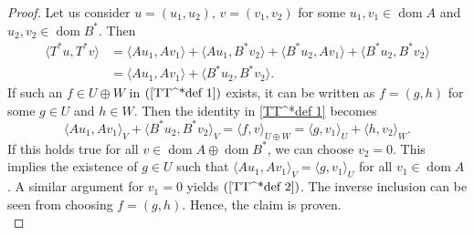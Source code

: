 \documentclass[11pt]{article}
\theoremstyle{definition}
\theoremstyle{remark}
\DeclareMathOperator\dom{dom}
\begin{document}
\begin{proof}
Let us consider $u=(u_1,u_2),\, v=(v_1,v_2)$ for some $u_1,v_1\in \dom A$ and $u_2,v_2\in \dom B^*$. Then
\begin{align*}
    \langle T^*u, T^*v\rangle&=\langle Au_1,Av_1\rangle+\langle Au_1,B^*v_2\rangle+\langle B^*u_2,Av_1\rangle+\langle B^*u_2,B^*v_2\rangle\\
    &=\langle Au_1,Av_1\rangle+\langle B^*u_2,B^*v_2\rangle.
\end{align*}
If such an $f\in U\oplus W$ in $(\ref{TT^*def 1})$ exists, it can be written as $f=(g,h)$ for some $g\in U$ and $h\in W$. Then the identity in \cref{TT^*def 1} becomes
$$\langle Au_1,Av_1\rangle_V+\langle B^*u_2,B^*v_2\rangle_V=\langle f,v\rangle_{U\oplus W}=\langle g,v_1\rangle_U +\langle h,v_2\rangle_W.$$
If this holds true for all $v\in \dom A\oplus \dom B^*$, we can choose $v_2=0$. This implies the existence of $g\in U$ such that $\langle Au_1,Av_1\rangle_V=\langle g,v_1\rangle_U$ for all $v_1\in\dom A$. A similar argument for $v_1=0$ yields $(\ref{TT^*def 2})$. The inverse inclusion can be seen from choosing $f=(g,h)$. Hence, the claim is proven.\\


\end{proof}
\end{document}
